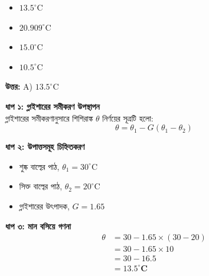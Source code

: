 \documentclass[12pt, a4paper]{article}
\begin{document}
\begin{itemize}[label={}, leftmargin=1cm, itemsep=0.5em]
    \item[\textbf{A)}] $13.5^\circ\text{C}$
    \item[\textbf{B)}] $20.909^\circ\text{C}$
    \item[\textbf{C)}] $15.0^\circ\text{C}$
    \item[\textbf{D)}] $10.5^\circ\text{C}$
\end{itemize}

\vspace{0.5em}
\begin{tcolorbox}[answerbox]
    \textbf{\color{success} উত্তর:} A) $13.5^\circ\text{C}$
\end{tcolorbox}
\vspace{1em}

\begin{tcolorbox}[solutionbox={সমাধান (Solution)}]
    \noindent
    \textbf{ধাপ ১: গ্লাইশারের সমীকরণ উপস্থাপন} \\
    গ্লাইশারের সমীকরণানুসারে শিশিরাঙ্ক $\theta$ নির্ণয়ের সূত্রটি হলো:
    \[ \theta = \theta_1 - G (\theta_1 - \theta_2) \]
    
    \vspace{0.4em}
    \noindent\textbf{ধাপ ২: উপাত্তসমূহ চিহ্নিতকরণ}
    \begin{itemize}[leftmargin=1.5em, itemsep=0.2em]
        \item শুষ্ক বাল্বের পাঠ, $\theta_1 = 30^\circ\text{C}$
        \item সিক্ত বাল্বের পাঠ, $\theta_2 = 20^\circ\text{C}$
        \item গ্লাইশারের উৎপাদক, $G = 1.65$
    \end{itemize}
    
    \vspace{0.4em}
    \noindent\textbf{ধাপ ৩: মান বসিয়ে গণনা}
    \begin{align*}
        \theta &= 30 - 1.65 \times (30 - 20) \\
        &= 30 - 1.65 \times 10 \\
        &= 30 - 16.5 \\
        &= \mathbf{13.5^\circ\text{C}}
    \end{align*}
\end{tcolorbox}

\vspace{2em}
\end{document}
